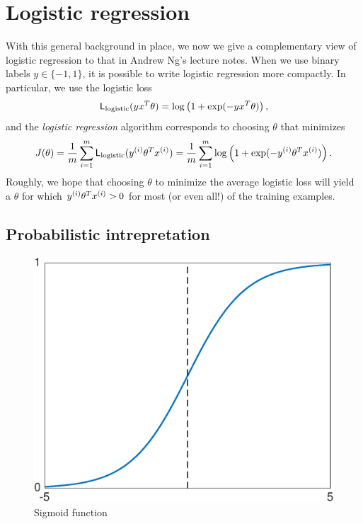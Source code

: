 \documentclass{article}
\begin{document}
\section{Logistic regression}

With this general background in place, we now we give a complementary view
of logistic regression to that in Andrew Ng's lecture notes.
When we use binary labels $y \in \{-1, 1\}$, it is possible to
write logistic regression more compactly. In particular, we use the
logistic loss
\begin{equation*}
  \mathsf{L}_{\rm logistic}(y x^T\theta)
  = \log\left(1 + \exp(-y x^T \theta)\right),
\end{equation*}
and the \emph{logistic regression} algorithm corresponds to choosing
$\theta$ that minimizes
\begin{equation}
  \label{eqn:logreg-risk}
  J(\theta) = \frac{1}{m}
  \sum_{i=1}^m \mathsf{L}_{\rm logistic}({y^{(i)}} \theta^T {x^{(i)}})
  = \frac{1}{m} \sum_{i=1}^m \log\left(1 + \exp(-{y^{(i)}} \theta^T {x^{(i)}})\right).
\end{equation}
Roughly, we hope that choosing $\theta$ to minimize the average logistic
loss will yield a $\theta$ for which ${y^{(i)}} \theta^T {x^{(i)}} > 0$ for most (or
even all!) of the training examples.


\subsection{Probabilistic intrepretation}

\begin{figure}[ht]
  \begin{center}
    \includegraphics[width=.6\columnwidth]{sigmoid.eps}
    \caption{\label{fig:sigmoid} Sigmoid function}
  \end{center}
\end{figure}
\end{document}
